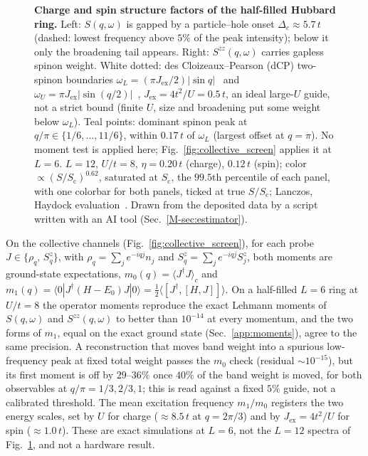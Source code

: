 \documentclass[aps,prb,onecolumn,superscriptaddress,longbibliography,floatfix]{revtex4-2}
\begin{document}
\begin{figure}[t]
\centering
{}
\caption{\textbf{Charge and spin structure factors of the half-filled Hubbard ring.} Left: $S(q,\omega)$ is gapped by a particle--hole onset $\Delta_c\approx5.7\,t$ (dashed: lowest frequency above $5\%$ of the peak intensity); below it only the broadening tail appears. Right: $S^{zz}(q,\omega)$ carries gapless spinon weight. White dotted: des Cloizeaux--Pearson (dCP) two-spinon boundaries $\omega_L=(\pi J_{\mathrm{ex}}/2)|\sin q|$~\cite{desCloizeauxPearson1962} and $\omega_U=\pi J_{\mathrm{ex}}|\sin(q/2)|$~\cite{Muller1981}, $J_{\mathrm{ex}}=4t^2/U=0.5\,t$, an ideal large-$U$ guide, not a strict bound (finite $U$, size and broadening put some weight below $\omega_L$). Teal points: dominant spinon peak at $q/\pi\in\{1/6,\dots,11/6\}$, within $0.17\,t$ of $\omega_L$ (largest offset at $q=\pi$). No moment test is applied here; Fig.~\ref{fig:collective_screen} applies it at $L=6$. $L=12$, $U/t=8$, $\eta=0.20\,t$ (charge), $0.12\,t$ (spin); color $\propto(S/S_{\mathrm c})^{0.62}$, saturated at $S_{\mathrm c}$, the $99.5$th percentile of each panel, with one colorbar for both panels, ticked at true $S/S_{\mathrm c}$; Lanczos, Haydock evaluation~\cite{Haydock1972,Lanczos1950}. Drawn from the deposited data by a script written with an AI tool (Sec.~\ref{M-sec:estimator}).}
\label{fig:sqw}
\end{figure}

On the collective channels (Fig.~\ref{fig:collective_screen}), for each probe $J\in\{\rho_q,\,S^z_q\}$, with $\rho_q=\sum_j e^{-iqj}n_j$ and $S^z_q=\sum_j e^{-iqj}S^z_j$, both moments are ground-state expectations, $m_0(q)=\langle J^\dagger J\rangle_c$ and $m_1(q)={\langle 0|J^\dagger(H-E_0)J|0\rangle}={\tfrac12\langle[J^\dagger,[H,J]]\rangle}$. On a half-filled $L=6$ ring at $U/t=8$ the operator moments reproduce the exact Lehmann moments of $S(q,\omega)$ and $S^{zz}(q,\omega)$ to better than $10^{-14}$ at every momentum, and the two forms of $m_1$, equal on the exact ground state (Sec.~\ref{app:moments}), agree to the same precision. A reconstruction that moves band weight into a spurious low-frequency peak at fixed total weight passes the $m_0$ check (residual $\sim\!10^{-15}$), but its first moment is off by $29$--$36\%$ once $40\%$ of the band weight is moved, for both observables at $q/\pi=1/3,2/3,1$; this is read against a fixed $5\%$ guide, not a calibrated threshold. The mean excitation frequency $m_1/m_0$ registers the two energy scales, set by $U$ for charge ($\approx8.5\,t$ at $q=2\pi/3$) and by $J_{\mathrm{ex}}=4t^2/U$ for spin ($\approx1.0\,t$). These are exact simulations at $L=6$, not the $L=12$ spectra of Fig.~\ref{fig:sqw}, and not a hardware result.
\end{document}
